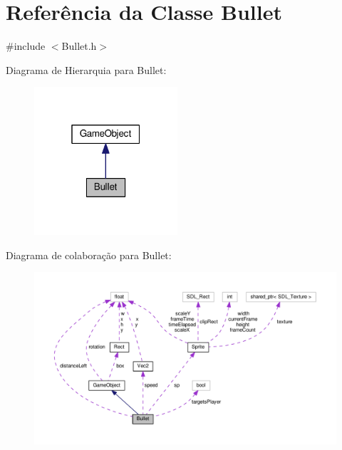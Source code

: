 \hypertarget{classBullet}{\section{Referência da Classe Bullet}
\label{classBullet}
}


{\ttfamily \#include $<$Bullet.\+h$>$}



Diagrama de Hierarquia para Bullet\+:\nopagebreak
\begin{figure}[H]
\begin{center}
\leavevmode
\includegraphics[width=151pt]{classBullet__inherit__graph}
\end{center}
\end{figure}


Diagrama de colaboração para Bullet\+:\nopagebreak
\begin{figure}[H]
\begin{center}
\leavevmode
\includegraphics[width=350pt]{classBullet__coll__graph}
\end{center}
\end{figure}
